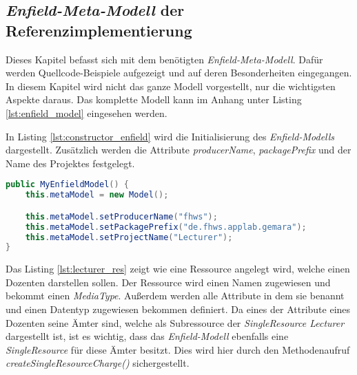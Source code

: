 \subsection{\textit{Enfield-Meta-Modell} der Referenzimplementierung} \label{sec:enfield_intro}
Dieses Kapitel befasst sich mit dem benötigten \textit{Enfield-Meta-Modell}. Dafür werden Quellcode-Beispiele aufgezeigt und auf deren Besonderheiten eingegangen. In diesem Kapitel wird nicht das ganze Modell vorgestellt, nur die wichtigsten Aspekte daraus. Das komplette Modell kann im Anhang unter Listing \ref{lst:enfield_model} eingesehen werden.

In Listing \ref{lst:constructor_enfield} wird die Initialisierung des \textit{Enfield-Modells} dargestellt. Zusätzlich werden die Attribute \textit{producerName}, \textit{packagePrefix} und der Name des Projektes festgelegt.

\begin{lstlisting}[label=lst:constructor_enfield,
language=java,
firstnumber=1,
caption=Initialisierung des \textit{Enfield-Meta-Modells}.]	
public MyEnfieldModel() {
	this.metaModel = new Model();

	this.metaModel.setProducerName("fhws");
	this.metaModel.setPackagePrefix("de.fhws.applab.gemara");
	this.metaModel.setProjectName("Lecturer");
}
\end{lstlisting}

Das Listing \ref{lst:lecturer_res} zeigt wie eine Ressource angelegt wird, welche einen Dozenten darstellen sollen. Der Ressource wird einen Namen zugewiesen und bekommt einen \textit{MediaType}. Außerdem werden alle Attribute in dem sie benannt und einen Datentyp zugewiesen bekommen definiert.
 Da eines der Attribute eines Dozenten seine Ämter sind, welche als Subressource der \textit{SingleResource Lecturer} dargestellt ist, ist es wichtig, dass das \textit{Enfield-Modell} ebenfalls eine \textit{SingleResource} für diese Ämter besitzt. Dies wird hier durch den Methodenaufruf \textit{createSingleResourceCharge()} sichergestellt.

\newpage

